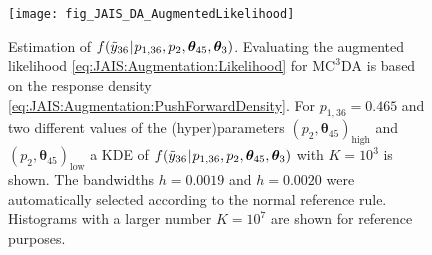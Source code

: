 \begin{figure}[htbp]
  \centering
  \texttt{[image: fig\_JAIS\_DA\_AugmentedLikelihood]}
  \caption[Estimation of \(f(\perfect{y}_{36} \cond p_{1,36},p_2,\bm{\theta}_{45},\bm{\theta}_3)\)]{Estimation of \(f(\perfect{y}_{36} \cond p_{1,36},p_2,\bm{\theta}_{45},\bm{\theta}_3)\).
           Evaluating the augmented likelihood \cref{eq:JAIS:Augmentation:Likelihood} for \(\text{MC}^3\text{DA}\) is based on the response density \cref{eq:JAIS:Augmentation:PushForwardDensity}.
           For \(p_{1,36} = 0.465\) and two different values of the (hyper)parameters \((p_2,\bm{\theta}_{45})_{\mathrm{high}}\) and \((p_2,\bm{\theta}_{45})_{\mathrm{low}}\)
           a KDE of \(f(\perfect{y}_{36} \cond p_{1,36},p_2,\bm{\theta}_{45},\bm{\theta}_3)\) with \(K=10^3\) is shown.
           The bandwidths \(h=0.0019\) and \(h=0.0020\) were automatically selected according to the normal reference rule.
           Histograms with a larger number \(K=10^7\) are shown for reference purposes.
          }
  \label{pre:JAIS:AugmentedLikelihood}
\end{figure}


